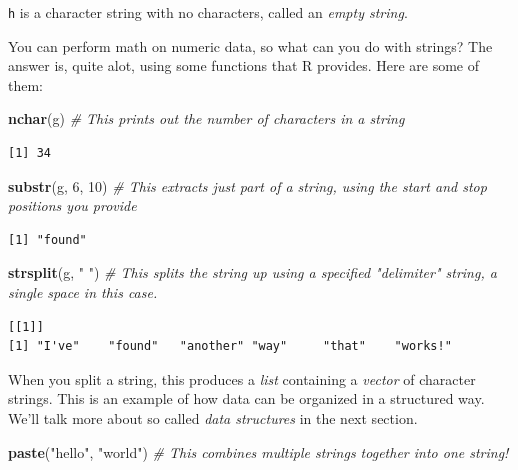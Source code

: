 \documentclass[
]{article}
\newenvironment{Shaded}{\begin{snugshade}}{\end{snugshade}}
\newcommand{\CommentTok}[1]{\textcolor[rgb]{0.56,0.35,0.01}{\textit{#1}}}
\newcommand{\DecValTok}[1]{\textcolor[rgb]{0.00,0.00,0.81}{#1}}
\newcommand{\KeywordTok}[1]{\textcolor[rgb]{0.13,0.29,0.53}{\textbf{#1}}}
\newcommand{\NormalTok}[1]{#1}
\newcommand{\StringTok}[1]{\textcolor[rgb]{0.31,0.60,0.02}{#1}}
\newenvironment{bonus}{
  \specialblock{bonus}{sun-fill.png}{Bonus}
}{\endspecialblock}
\begin{document}
\texttt{h} is a character string with no characters, called an \emph{empty string}.

You can perform math on numeric data, so what can you do with strings?
The answer is, quite alot, using some functions that R provides.
Here are some of them:

\begin{Shaded}
\begin{Highlighting}[]
\KeywordTok{nchar}\NormalTok{(g)   }\CommentTok{# This prints out the number of characters in a string}
\end{Highlighting}
\end{Shaded}

\begin{verbatim}
[1] 34
\end{verbatim}

\begin{Shaded}
\begin{Highlighting}[]
\KeywordTok{substr}\NormalTok{(g, }\DecValTok{6}\NormalTok{, }\DecValTok{10}\NormalTok{)   }\CommentTok{# This extracts just part of a string, using the start and stop positions you provide}
\end{Highlighting}
\end{Shaded}

\begin{verbatim}
[1] "found"
\end{verbatim}

\begin{Shaded}
\begin{Highlighting}[]
\KeywordTok{strsplit}\NormalTok{(g, }\StringTok{" "}\NormalTok{)   }\CommentTok{# This splits the string up using a specified "delimiter" string, a single space in this case. }
\end{Highlighting}
\end{Shaded}

\begin{verbatim}
[[1]]
[1] "I've"    "found"   "another" "way"     "that"    "works!" 
\end{verbatim}

\begin{bonus}
When you split a string, this produces a \emph{list} containing a
\emph{vector} of character strings. This is an example of how data can
be organized in a structured way. We'll talk more about so called
\emph{data structures} in the next section.
\end{bonus}

\begin{Shaded}
\begin{Highlighting}[]
\KeywordTok{paste}\NormalTok{(}\StringTok{"hello"}\NormalTok{, }\StringTok{"world"}\NormalTok{)   }\CommentTok{# This combines multiple strings together into one string!}
\end{Highlighting}
\end{Shaded}
\end{document}
